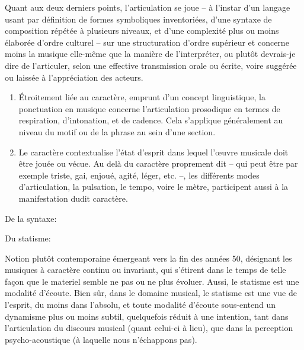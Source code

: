 \documentclass{article}
\newcommand{\myuline}[1]{%
  \uline{\phantom{#1}}%
  \llap{{#1}}%
}
\begin{document}
Quant aux deux derniers points, l'articulation se joue -- à l'instar d'un langage usant par définition de formes symboliques inventoriées, d'une syntaxe de composition répétée à plusieurs niveaux, et d'une complexité plus ou moins élaborée d'ordre culturel -- sur une structuration d'ordre supérieur et concerne moins la musique elle-même que la manière de l'interpréter, ou plutôt devrais-je dire de l'articuler, selon une effective transmission orale ou écrite, voire suggérée ou laissée à l'appréciation des acteurs. 

\begin{enumerate}[resume]

\item \myuline{Ponctuation}

Étroitement liée au caractère,  emprunt d'un concept linguistique, la ponctuation en musique concerne l'articulation prosodique en termes de respiration, d'intonation, et de cadence. Cela s'applique généralement au niveau du motif ou de la phrase au sein d'une section.

\item \myuline{Caractère}

Le caractère contextualise l'état d'esprit dans lequel l'œuvre musicale doit être jouée ou vécue. Au delà du caractère proprement dit -- qui peut être par exemple triste, gai, enjoué, agité, léger, etc. --, les différents modes d'articulation, la pulsation, le tempo, voire le mètre, participent aussi à la manifestation dudit caractère.

\end{enumerate}

\bigskip

De la syntaxe:

\smallskip


\bigskip

Du statisme:

\smallskip 

\noindent Notion plutôt contemporaine émergeant vers la fin des années 50, désignant les musiques à caractère continu ou invariant, qui s'étirent dans le temps de telle façon que le materiel semble ne pas ou ne plus évoluer.  Aussi, le statisme est une modalité d'écoute. 
Bien sûr, dans le domaine musical, le statisme est une vue de l'esprit, du moins dans l'absolu, et toute modalité d'écoute sous-entend un dynamisme plus ou moins subtil, quelquefois réduit à une intention, tant dans l'articulation du discours musical (quant celui-ci à lieu), que dans la perception psycho-acoustique (à laquelle nous n'échappons pas).
\end{document}
